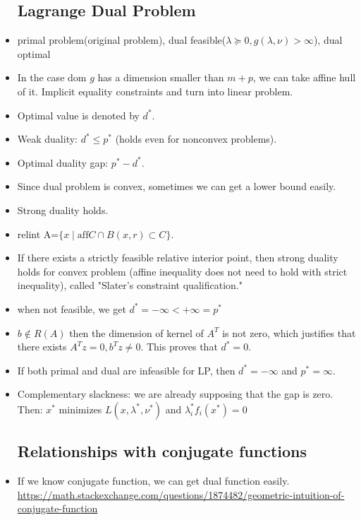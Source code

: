 \documentclass{article}
\theoremstyle{remark}
\begin{document}
\begin{itemize}
    \subsection*{Lagrange Dual Problem}
    \item primal problem(original problem), dual feasible($\lambda\succeq 0,g(\lambda,\nu)>\infty$), dual optimal
    \item In the case dom $g$ has a dimension smaller than $m+p$, we can take affine hull of it. Implicit equality constraints and turn into linear problem.
    \item Optimal value is denoted by $d^*$.
    \item Weak duality: $d^*\leq p^*$ (holds even for nonconvex problems).
    \item Optimal duality gap: $p^*-d^*$.
    \item Since dual problem is convex, sometimes we can get a lower bound easily.
    \item Strong duality holds.
    \item relint A=$\{x\mid \text{aff} C\cap B(x,r)\subset C\}$. 
    \item If there exists a strictly feasible relative interior point, then strong duality holds for convex problem (affine inequality does not need to hold with strict inequality), called "Slater's constraint qualification."
    \item when not feasible, we get $d^*=-\infty<+\infty=p^*$
    \item $b\not\in R(A)$ then the dimension of kernel of $A^T$ is not zero, which justifies that there exists $A^Tz=0,b^Tz\neq 0$. This proves that $d^*=0$.
    \item If both primal and dual are infeasible for LP, then $d^*=-\infty$ and $p^*=\infty$.
    \item Complementary slackness: we are already supposing that the gap is zero. Then: $x^*$ minimizes $L(x,\lambda^*,\nu^*)$ and $\lambda_i^*f_i(x^*)=0$
    \subsection*{Relationships with conjugate functions}
    \item If we know conjugate function, we can get dual function easily. \url{https://math.stackexchange.com/questions/1874482/geometric-intuition-of-conjugate-function}

\end{itemize}
\end{document}
